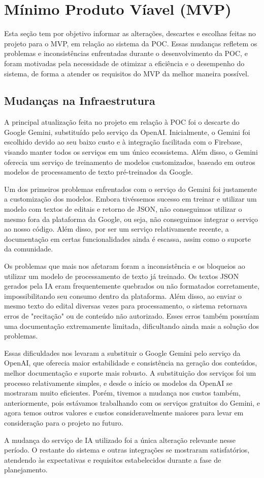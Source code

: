 \section{Mínimo Produto Víavel (MVP)}

Esta seção tem por objetivo informar as alterações, descartes e escolhas feitas no projeto para o MVP, em relação ao sistema da POC. Essas mudanças refletem os problemas e inconsistências enfrentadas durante o desenvolvimento da POC, e foram motivadas pela necessidade de otimizar a eficiência e o desempenho do sistema, de forma a atender os requisitos do MVP da melhor maneira possível.

\subsection{Mudanças na Infraestrutura}
 
	A principal atualização feita no projeto em relação à POC foi o descarte do Google Gemini, substituído pelo serviço da OpenAI. Inicialmente, o Gemini foi escolhido devido ao seu baixo custo e à integração facilitada com o Firebase, visando manter todos os serviços em um único ecossistema. Além disso, o Gemini oferecia um serviço de treinamento de modelos customizados, baseado em outros modelos de processamento de texto pré-treinados da Google.
 
	Um dos primeiros problemas enfrentados com o serviço do Gemini foi justamente a customização dos modelos. Embora tivéssemos sucesso em treinar e utilizar um modelo com textos de editais e retorno de JSON, não conseguimos utilizar o mesmo fora da plataforma da Google, ou seja, não conseguimos integrar o serviço ao nosso código. Além disso, por ser um serviço relativamente recente, a documentação em certas funcionalidades ainda é escassa, assim como o suporte da comunidade.
 
	Os problemas que mais nos afetaram foram a inconsistência e os bloqueios ao utilizar um modelo de processamento de texto já treinado. Os textos JSON gerados pela IA eram frequentemente quebrados ou não formatados corretamente, impossibilitando seu consumo dentro da plataforma. Além disso, ao enviar o mesmo texto do edital diversas vezes para processamento, o sistema retornava erros de "recitação" ou de conteúdo não autorizado. Esses erros também possuíam uma documentação extremamente limitada, dificultando ainda mais a solução dos problemas.
 
	Essas dificuldades nos levaram a substituir o Google Gemini pelo serviço da OpenAI, que oferecia maior estabilidade e consistência na geração dos conteúdos, melhor documentação e suporte mais robusto. A substituição dos serviços foi um processo relativamente simples, e desde o início os modelos da OpenAI se mostraram muito eficientes. Porém, tivemos a mudança nos custos também, anteriormente, pois estávamos trabalhando com os serviços gratuitos do Gemini, e agora temos outros valores e custos consideravelmente maiores para levar em consideração para o projeto no futuro.
 
	A mudança do serviço de IA utilizado foi a única alteração relevante nesse período. O restante do sistema e outras integrações se mostraram satisfatórios, atendendo às expectativas e requisitos estabelecidos durante a fase de planejamento.